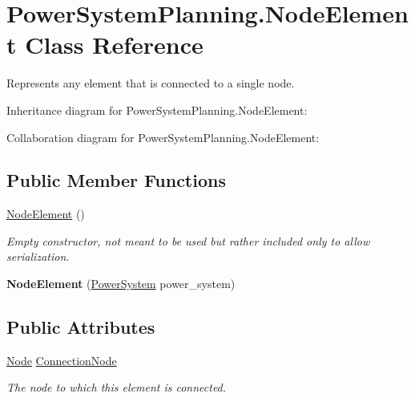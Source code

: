 \hypertarget{class_power_system_planning_1_1_node_element}{}\section{Power\+System\+Planning.\+Node\+Element Class Reference}
\label{class_power_system_planning_1_1_node_element}


Represents any element that is connected to a single node.  




Inheritance diagram for Power\+System\+Planning.\+Node\+Element\+:


Collaboration diagram for Power\+System\+Planning.\+Node\+Element\+:
\subsection*{Public Member Functions}
\begin{DoxyCompactItemize}
\item 
\hyperlink{class_power_system_planning_1_1_node_element_ab6f2652d513f4c2395586e51b3bdacca}{Node\+Element} ()
\begin{DoxyCompactList}\small\item\em Empty constructor, not meant to be used but rather included only to allow serialization. \end{DoxyCompactList}\item 
{\bfseries Node\+Element} (\hyperlink{class_power_system_planning_1_1_power_system}{Power\+System} power\+\_\+system)\hypertarget{class_power_system_planning_1_1_node_element_af98f605241d05e91e17c659b8b511813}{}\label{class_power_system_planning_1_1_node_element_af98f605241d05e91e17c659b8b511813}

\end{DoxyCompactItemize}
\subsection*{Public Attributes}
\begin{DoxyCompactItemize}
\item 
\hyperlink{class_power_system_planning_1_1_node}{Node} \hyperlink{class_power_system_planning_1_1_node_element_ade5e2883dbd6d8676a8572c827f6b60a}{Connection\+Node}
\begin{DoxyCompactList}\small\item\em The node to which this element is connected. \end{DoxyCompactList}\end{DoxyCompactItemize}
